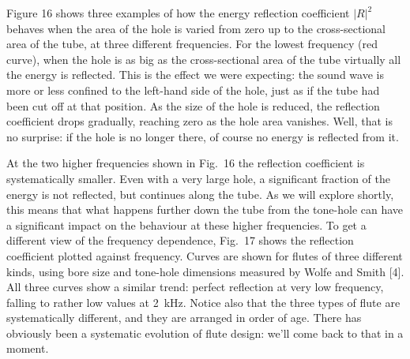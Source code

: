 
  Figure 16 shows three examples of how the energy reflection coefficient 
  $|R|^2$ behaves when the area of the hole is varied from zero up to the 
  cross-sectional area of the tube, at three different frequencies. For the 
  lowest frequency (red curve), when the hole is as big as the cross-sectional 
  area of the tube virtually all the energy is reflected. This is the effect we 
  were expecting: the sound wave is more or less confined to the left-hand side 
  of the hole, just as if the tube had been cut off at that position. As the 
  size of the hole is reduced, the reflection coefficient drops gradually, 
  reaching zero as the hole area vanishes. Well, that is no surprise: if the 
  hole is no longer there, of course no energy is reflected from it. 


  At the two higher frequencies shown in Fig.\ 16 the reflection coefficient is 
  systematically smaller. Even with a very large hole, a significant fraction 
  of the energy is not reflected, but continues along the tube. As we will 
  explore shortly, this means that what happens further down the tube from the 
  tone-hole can have a significant impact on the behaviour at these higher 
  frequencies. To get a different view of the frequency dependence, Fig.\ 17 
  shows the reflection coefficient plotted against frequency. Curves are shown 
  for flutes of three different kinds, using bore size and tone-hole dimensions 
  measured by Wolfe and Smith [4]. All three curves show a similar trend: 
  perfect reflection at very low frequency, falling to rather low values at 
  2~kHz. Notice also that the three types of flute are systematically 
  different, and they are arranged in order of age. There has obviously been a 
  systematic evolution of flute design: we’ll come back to that in a moment. 


